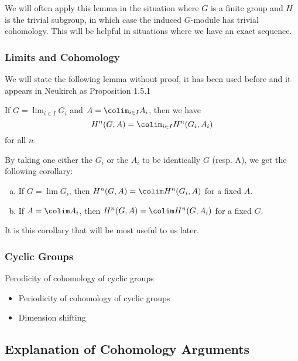We will often apply this lemma in the situation where
\(G\) is a finite group and \(H\) is the trivial subgroup,
in which case the induced \(G\)-module has trivial cohomology.
This will be helpful in situations where we have an exact sequence.

\subsubsection{Limits and Cohomology}

We will state the following lemma without proof, it has been used before
and it appears in Neukirch as Proposition 1.5.1

\begin{lemma}
	If \(G = \lim_{i \in I} G_{i}\) and \(A = \colim_{i \in I} A_{i}\),
	then we have 
	\[
		H^{n}(G,A) = \colim_{i \in I} H^{n}(G_{i},A_{i})
	\] 
	for all \(n\)
\end{lemma}

By taking one either the \(G_{i}\) or the \(A_{i}\) to be identically
\(G\) (resp. A), we get the following corollary:

\begin{corollary}\label{cor:lim:cohom}
	\begin{enumerate}[(a)]
		\item If \(G = \lim G_{i}\), then 
			\(H^{n}(G,A) = \colim H^{n}(G_{i},A)\) for a fixed \(A\).
		\item If \(A = \colim A_{i}\), then 
			\(H^{n}(G,A) = \colim H^{n}(G,A_{i})\) for a fixed \(G\).
	\end{enumerate}
\end{corollary}

It is this corollary that will be most useful to us later.

\subsubsection{Cyclic Groups}

\begin{lemma} \label{lem:cohom:cycl}
	Perodicity of cohomology of cyclic groups
\end{lemma}

\begin{itemize}
	\item Periodicity of cohomology of cyclic groups
	\item Dimension shifting
\end{itemize}

\subsection{Explanation of Cohomology Arguments}


